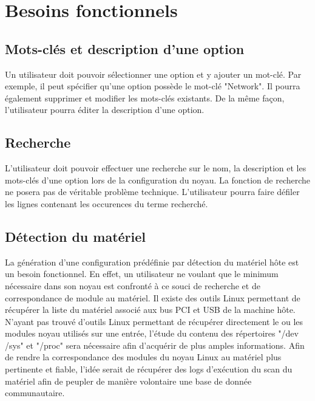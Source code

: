 \documentclass[16pts]{report}
\begin{document}

\nocite{*}

\chapter{Besoins fonctionnels}
\label{cha:Besoins fonctionnels}


\section{Mots-clés et description d'une option}
\label{sec:Mots-clés et description d'une option}

Un utilisateur doit pouvoir sélectionner une option et y ajouter un mot-clé.
Par exemple, il peut spécifier qu'une option possède le mot-clé "Network". Il
pourra également supprimer et modifier les mots-clés existants. De la même
façon, l'utilisateur pourra éditer la description d'une option.

\section{Recherche}
\label{sec:Recherche}

L'utilisateur doit pouvoir effectuer une recherche sur le nom, la description
et les mots-clés d'une option lors de la configuration du noyau. La fonction de
recherche ne posera pas de véritable problème technique. L'utilisateur pourra
faire défiler les lignes contenant les occurences du terme recherché.

\section{Détection du matériel}
\label{sec:Détection du matériel}

La génération d'une configuration prédéfinie par détection du matériel hôte est
un besoin fonctionnel. En effet, un utilisateur ne voulant que le minimum
nécessaire dans son noyau est confronté à ce souci de recherche et de
correspondance de module au matériel.
Il existe des outils Linux permettant de récupérer la liste du matériel associé
aux bus PCI et USB de la machine hôte.
N'ayant pas trouvé d'outils Linux permettant de récupérer directement le ou les
modules noyau utilisés sur une entrée, l'étude du contenu des répertoires "/dev
/sys" et "/proc" sera nécessaire afin d'acquérir de plus amples informations.
Afin de rendre la correspondance des modules du noyau Linux au matériel plus
pertinente et fiable, l'idée serait de récupérer des logs d'exécution du scan
du matériel afin de peupler de manière volontaire une base de donnée
communautaire.
\end{document}
